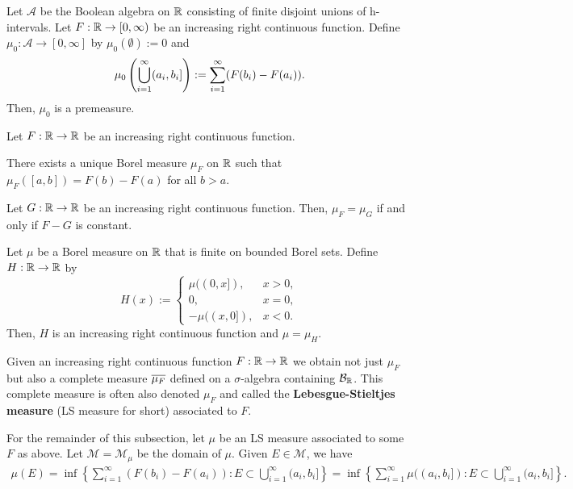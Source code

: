 \documentclass[11pt]{article}
\renewcommand{\A}{\mathcal{A}}
\newcommand{\B}{\mathcal{B}}
\newcommand{\M}{\mathcal{M}}
\newcommand{\ssum}{\displaystyle\sum}
\begin{document}
\begin{proposition}
Let $\A$ be the Boolean algebra on $\mathbb{R}$ consisting of finite disjoint unions of h-intervals. Let $F: \mathbb{R}\to[0,\infty)$ be an increasing right continuous function. Define $\mu_0: \A\to[0,\infty]$ by $\mu_0(\emptyset):=0$ and 
$$\mu_0\paren{\bigcup_{i=1}^{\infty}(a_i,b_i]}:=\ssum_{i=1}^{\infty}(F(b_i)-F(a_i)).$$
Then, $\mu_0$ is a premeasure.
\end{proposition}

\begin{theorem}
Let $F: \mathbb{R}\to\mathbb{R}$ be an increasing right continuous function. 
\begin{enum}{\alph}
\item There exists a unique Borel measure $\mu_F$ on $\mathbb{R}$ such that $\mu_F([a,b])=F(b)-F(a)$ for all $b>a$.

\item Let $G: \mathbb{R}\to\mathbb{R}$ be an increasing right continuous function. Then, $\mu_F=\mu_G$ if and only if $F-G$ is constant.

\item Let $\mu$ be a Borel measure on $\mathbb{R}$ that is finite on bounded Borel sets. Define $H: \mathbb{R}\to\mathbb{R}$ by 
\begin{equation*}
H(x):=
\begin{cases}
\mu((0,x]), & x>0, \\
0, & x=0, \\
-\mu((x,0]), & x<0.
\end{cases}
\end{equation*}
Then, $H$ is an increasing right continuous function and $\mu=\mu_H$.
\end{enum}
\end{theorem}

Given an increasing right continuous function $F: \mathbb{R}\to\mathbb{R}$ we obtain not just $\mu_F$ but also a complete measure $\overline{\mu_F}$ defined on a $\sigma$-algebra containing $\B_{\R}$. This complete measure is often also denoted $\mu_F$ and called the \textbf{Lebesgue-Stieltjes measure} (LS measure for short) associated to $F$. 

For the remainder of this subsection, let $\mu$ be an LS measure associated to some $F$ as above. Let $\M=\M_{\mu}$ be the domain of $\mu$. Given $E\in\M$, we have 
\begin{align*}
\mu(E)
=\inf\left\{\ssum_{i=1}^{\infty}(F(b_i)-F(a_i)) : E\subset\bigcup_{i=1}^{\infty}(a_i,b_i]\right\}
=\inf\left\{\ssum_{i=1}^{\infty}\mu((a_i,b_i]) : E\subset\bigcup_{i=1}^{\infty}(a_i,b_i]\right\}.
\end{align*}
\end{document}
